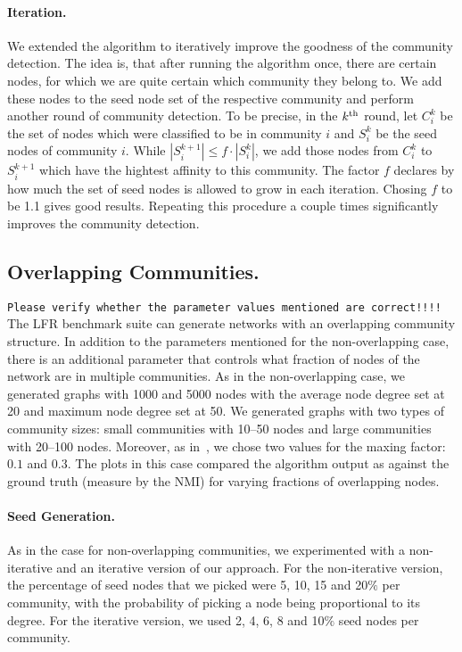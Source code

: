 \paragraph{Iteration.}
We extended the algorithm to iteratively improve the goodness of the community detection.
The idea is, that after running the algorithm once, there are
certain nodes, for which we are quite certain which community they belong to.
We add these nodes to the seed node set of the respective community
and perform another round of community detection.
To be precise, in the $k^{\textrm{th}}$ round, let $C^k_i$ be the set of nodes which were classified to be in community $i$ and $S^k_i$ be the seed nodes of community $i$.
While $| S^{k+1}_i | \le f \cdot | S^{k}_i |$, we add those nodes from $C^k_i$ to $S^{k+1}_i$ which have the hightest affinity to this community.
The factor $f$ declares by how much the set of seed nodes is allowed to grow in each iteration. 
Chosing $f$ to be 1.1 gives good results.
Repeating this procedure a couple times significantly improves the community detection.

\subsection{Overlapping Communities.}
\texttt{Please verify whether the parameter values mentioned are correct!!!!}
The LFR benchmark suite can generate networks with an overlapping community structure. 
In addition to the parameters mentioned for the non-overlapping case, there is an additional 
parameter that controls what fraction of nodes of the network are in multiple communities. 
As in the non-overlapping case, we generated graphs with 1000 and 5000 nodes with the average
node degree set at 20 and maximum node degree set at 50. We generated graphs with two types 
of community sizes: small communities with 10--50 nodes and large communities with 20--100 nodes.
Moreover, as in~\cite{LF09}, we chose two values for the maxing factor: $0.1$ and $0.3$. 
The plots in this case compared the algorithm output as against the ground truth (measure by 
the NMI) for varying fractions of overlapping nodes. 

\paragraph{Seed Generation.}
As in the case for non-overlapping communities, we experimented with a non-iterative 
and an iterative version of our approach. For the non-iterative version, the percentage 
of seed nodes that we picked were 5, 10, 15 and 20$\%$ per community, with the probability
of picking a node being proportional to its degree. For the iterative version, we used 
2, 4, 6, 8 and 10$\%$ seed nodes per community. 

